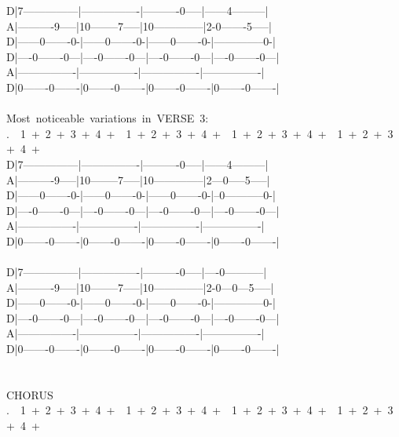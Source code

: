 {D|7---------------|----------------|----------0-----|------4---------|\\
A|----------9-----|10--------7-----|10--------------|2-0-------5-----|\\
D|------0-------0-|------0-------0-|------0-------0-|--------------0-|\\
D|----0-------0---|----0-------0---|----0-------0---|----0-------0---|\\
A|----------------|----------------|----------------|----------------|\\
D|0-------0-------|0-------0-------|0-------0-------|0-------0-------|\\
\\
Most\ noticeable\ variations\ in\ VERSE\ 3:\\
.\ \ 1\ +\ 2\ +\ 3\ +\ 4\ +\ \ 1\ +\ 2\ +\ 3\ +\ 4\ +\ \ 1\ +\ 2\ +\ 3\ +\ 4\ +\ \ 1\ +\ 2\ +\ 3\ +\ 4\ +\\
D|7---------------|----------------|----------0-----|------4---------|\\
A|----------9-----|10--------7-----|10--------------|2---0-----5-----|\\
D|------0-------0-|------0-------0-|------0-------0-|--0-----------0-|\\
D|----0-------0---|----0-------0---|----0-------0---|----0-------0---|\\
A|----------------|----------------|----------------|----------------|\\
D|0-------0-------|0-------0-------|0-------0-------|0-------0-------|\\
\\
D|7---------------|----------------|----------0-----|----0-----------|\\
A|----------9-----|10--------7-----|10--------------|2-0---0---5-----|\\
D|------0-------0-|------0-------0-|------0-------0-|--------------0-|\\
D|----0-------0---|----0-------0---|----0-------0---|----0-------0---|\\
A|----------------|----------------|----------------|----------------|\\
D|0-------0-------|0-------0-------|0-------0-------|0-------0-------|\\
\\
\\
CHORUS\\
.\ \ 1\ +\ 2\ +\ 3\ +\ 4\ +\ \ 1\ +\ 2\ +\ 3\ +\ 4\ +\ \ 1\ +\ 2\ +\ 3\ +\ 4\ +\ \ 1\ +\ 2\ +\ 3\ +\ 4\ +\\
}
